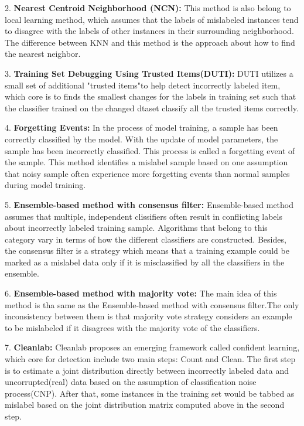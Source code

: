 2. \textbf{Nearest Centroid Neighborhood (NCN):} This method is also belong to local learning method, which assumes that the labels of mislabeled instances tend to disagree with the labels of other instances in their surrounding neighborhood. The difference between KNN and this method is the approach about how to find the nearest neighbor.

3. \textbf{Training Set Debugging Using Trusted Items(DUTI):} DUTI utilizes a small set of additional "trusted items"to help detect incorrectly labeled item, which core is to finds the smallest changes for the labels in training set such that the classifier trained on the changed dtaset classify all the trusted items correctly.

4. \textbf{Forgetting Events:} In the process of model training, a sample has been correctly classified by the model. With the update of model parameters, the sample has been incorrectly classified. This process is called a forgetting event of the sample. This method identifies a mislabel sample based on one assumption that noisy sample often experience more forgetting events than normal samples during model training. 

5. \textbf{Ensemble-based method with consensus filter:}  Ensemble-based method assumes that multiple, independent clissifiers often result in conflicting labels about incorrectly labeled training sample. Algorithms that belong to this category vary in terms of how the different classifiers are constructed. Besides, the consensus filter is a strategy which means that a training example could be marked as a mislabel data only if it is misclassified by all the classifiers in the ensemble.

6. \textbf{Ensemble-based method with majority vote:}  The main idea of this method is tha same as the Ensemble-based method with consensus filter.The only inconsistency between them is that majority vote strategy considers an example to be mislabeled if it disagrees with the majority vote of the classifiers.

7. \textbf{Cleanlab:} Cleanlab proposes an emerging framework called confident learning, which core for detection include two main steps: Count and Clean. The first step is to estimate a joint distribution directly between incorrectly labeled data and uncorrupted(real) data based on the assumption of classification noise process(CNP). After that, some instances in the training set would be tabbed as mislabel based on the joint distribution matrix computed above in the second step.

